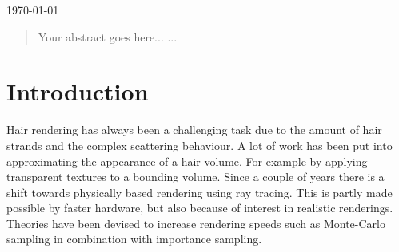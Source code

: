 \documentclass[11pt,a4paper]{report}
\begin{document}
\begin{titlepage}


{\large \today}\\[3cm] %


 

\vfill %

\end{titlepage}

%
%
\begin{abstract}
Your abstract goes here...
...
\end{abstract}

%
%
\tableofcontents

\chapter{Introduction}


Hair rendering has always been a challenging task due to the amount of hair strands and the complex scattering behaviour. A lot of work has been put into approximating the appearance of a hair volume. For example by applying transparent textures to a bounding volume. Since a couple of years there is a shift towards physically based rendering using ray tracing. This is partly made possible by faster hardware, but also because of interest in realistic renderings. Theories have been devised to increase rendering speeds such as Monte-Carlo sampling in combination with importance sampling.
\end{document}
